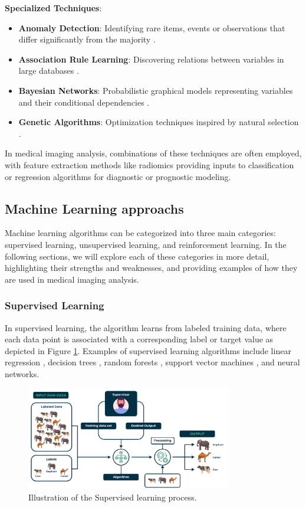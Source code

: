 \textbf{Specialized Techniques}:
\begin{itemize}
  \item \textbf{Anomaly Detection}: Identifying rare items, events or observations that differ significantly from the majority \cite{chandola2009anomaly}.
  \item \textbf{Association Rule Learning}: Discovering relations between variables in large databases \cite{agrawal1993mining}.
  \item \textbf{Bayesian Networks}: Probabilistic graphical models representing variables and their conditional dependencies \cite{pearl1988probabilistic}.
  \item \textbf{Genetic Algorithms}: Optimization techniques inspired by natural selection \cite{holland1992adaptation}.
\end{itemize}

In medical imaging analysis, combinations of these techniques are often employed, with feature extraction methods like radiomics providing inputs to classification or regression algorithms for diagnostic or prognostic modeling.

\subsection{Machine Learning approachs}
Machine learning algorithms can be categorized into three main categories: supervised learning, unsupervised learning, and reinforcement learning. In the following sections, we will explore each of these categories in more detail, highlighting their strengths and weaknesses, and providing examples of how they are used in medical imaging analysis.
\subsubsection{Supervised Learning}
In supervised learning, the algorithm learns from labeled training data, where each data point is associated with a corresponding label or target value as depicted in Figure \ref{fig:superml}. Examples of supervised learning algorithms include linear regression , decision trees , random forests , support vector machines , and neural networks.

\begin{figure}[H]
  \centering
  \includegraphics[width=0.8\textwidth]{Images/Chapter1/superml.png}
  \caption{Illustration of the Supervised learning process. \cite{geeksforgeeks2025supervised}}
  \label{fig:superml}
\end{figure}


